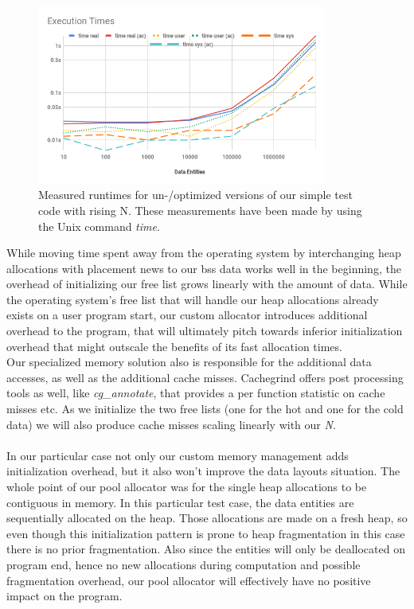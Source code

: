 \begin{figure}[!htbp]
	\centering
	\includegraphics[width=0.85\textwidth, height=0.5\textwidth]{PICs/test_file_execution_times}
	\caption{Measured runtimes for un-/optimized versions of our simple test code with rising N. These measurements have been made by using the Unix command \textit{time}.}
	\label{test_file_execution_times}
\end{figure}
While moving time spent away from the operating system by interchanging heap allocations with placement news to our bss data works well in the beginning, the overhead of initializing our free list grows linearly with the amount of data. While the operating system's free list that will handle our heap allocations already exists on a user program start, our custom allocator introduces additional overhead to the program, that will ultimately pitch towards inferior initialization overhead that might outscale the benefits of its fast allocation times.\\
Our specialized memory solution also is responsible for the additional data accesses, as well as the additional cache misses. Cachegrind offers post processing tools as well, like \textit{cg\_annotate}, that provides a per function statistic on cache misses etc. As we initialize the two free lists (one for the hot and one for the cold data) we will also produce cache misses scaling linearly with our \textit{N}.\\\\
In our particular case not only our custom memory management adds initialization overhead, but it also won't improve the data layouts situation. The whole point of our pool allocator was for the single heap allocations to be contiguous in memory. In this particular test case, the data entities are sequentially allocated on the heap. Those allocations are made on a fresh heap, so even though this initialization pattern is prone to heap fragmentation in this case there is no prior fragmentation. Also since the entities will only be deallocated on program end, hence no new allocations during computation and possible fragmentation overhead, our pool allocator will effectively have no positive impact on the program. 
